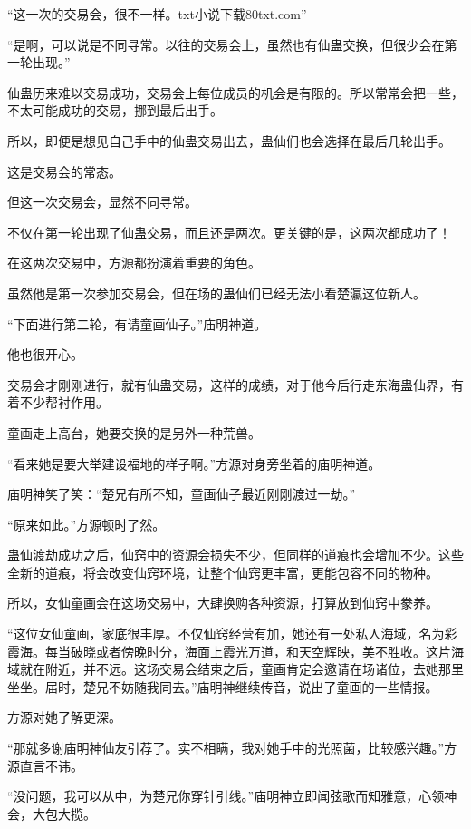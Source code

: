 
\begin{this_body}

“这一次的交易会，很不一样。txt小说下载80txt.com”

“是啊，可以说是不同寻常。以往的交易会上，虽然也有仙蛊交换，但很少会在第一轮出现。”

仙蛊历来难以交易成功，交易会上每位成员的机会是有限的。所以常常会把一些，不太可能成功的交易，挪到最后出手。

所以，即便是想见自己手中的仙蛊交易出去，蛊仙们也会选择在最后几轮出手。

这是交易会的常态。

但这一次交易会，显然不同寻常。

不仅在第一轮出现了仙蛊交易，而且还是两次。更关键的是，这两次都成功了！

在这两次交易中，方源都扮演着重要的角色。

虽然他是第一次参加交易会，但在场的蛊仙们已经无法小看楚瀛这位新人。

“下面进行第二轮，有请童画仙子。”庙明神道。

他也很开心。

交易会才刚刚进行，就有仙蛊交易，这样的成绩，对于他今后行走东海蛊仙界，有着不少帮衬作用。

童画走上高台，她要交换的是另外一种荒兽。

“看来她是要大举建设福地的样子啊。”方源对身旁坐着的庙明神道。

庙明神笑了笑：“楚兄有所不知，童画仙子最近刚刚渡过一劫。”

“原来如此。”方源顿时了然。

蛊仙渡劫成功之后，仙窍中的资源会损失不少，但同样的道痕也会增加不少。这些全新的道痕，将会改变仙窍环境，让整个仙窍更丰富，更能包容不同的物种。

所以，女仙童画会在这场交易中，大肆换购各种资源，打算放到仙窍中豢养。

“这位女仙童画，家底很丰厚。不仅仙窍经营有加，她还有一处私人海域，名为彩霞海。每当破晓或者傍晚时分，海面上霞光万道，和天空辉映，美不胜收。这片海域就在附近，并不远。这场交易会结束之后，童画肯定会邀请在场诸位，去她那里坐坐。届时，楚兄不妨随我同去。”庙明神继续传音，说出了童画的一些情报。

方源对她了解更深。

“那就多谢庙明神仙友引荐了。实不相瞒，我对她手中的光照菌，比较感兴趣。”方源直言不讳。

“没问题，我可以从中，为楚兄你穿针引线。”庙明神立即闻弦歌而知雅意，心领神会，大包大揽。


\end{this_body}
